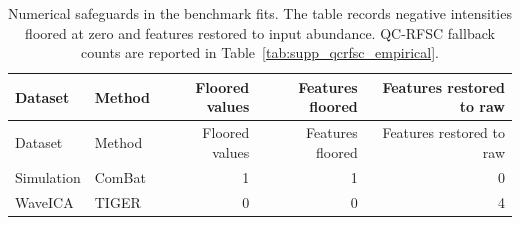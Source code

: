 \scriptsize
\begin{longtable}{llrrr}
\caption{Numerical safeguards in the benchmark fits. The table records negative intensities floored at zero and features restored to input abundance. QC-RFSC fallback counts are reported in Table~\ref{tab:supp_qcrfsc_empirical}.}\label{tab:supp_primary_safeguards}\\
\toprule
Dataset & Method & Floored values & Features floored & Features restored to raw \\
\midrule
\endfirsthead
\toprule
Dataset & Method & Floored values & Features floored & Features restored to raw \\
\midrule
\endhead
\bottomrule
\endlastfoot
Simulation & ComBat & 1 & 1 & 0 \\
WaveICA & TIGER & 0 & 0 & 4 \\
\end{longtable}
